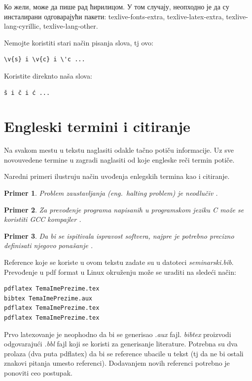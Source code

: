 \documentclass[a4paper]{article}
\newtheorem{primer}{Primer}[section]
\begin{document}
Ко жели, може да пише рад ћирилицом. У том случају, неопходно је да су инсталирани одговарајући пакети: texlive-fonts-extra, texlive-latex-extra, texlive-lang-cyrillic, texlive-lang-other. 

Nemojte koristiti stari način pisanja slova, tj ovo:
\begin{verbatim}
\v{s} i \v{c} i \'c ...
\end{verbatim}
Koristite direknto naša slova:	
\begin{verbatim}
š i č i ć ... 
\end{verbatim}


\section{Engleski termini i citiranje}	
\label{sec:termini_i_citiranje}

Na svakom mestu u tekstu naglasiti odakle tačno potiču informacije. Uz sve novouvedene termine u zagradi naglasiti od koje engleske reči termin potiče. 

Naredni primeri ilustruju način uvođenja enlegskih termina kao i citiranje.

\begin{primer}
Problem zaustavljanja (eng.~{\em halting problem}) je neodlučiv \cite{haltingproblem}.
\end{primer}

\begin{primer}
Za prevođenje programa napisanih u programskom jeziku C može se koristiti GCC kompajler \cite{gcc}.
\end{primer}

\begin{primer}
 Da bi se ispitivala ispravost softvera, najpre je potrebno precizno definisati njegovo ponašanje \cite{laski2009software}. 
\end{primer}

Reference koje se koriste u ovom tekstu zadate su u datoteci {\em seminarski.bib}. Prevođenje u pdf format u Linux okruženju može se uraditi na sledeći način:
\begin{verbatim}
pdflatex TemaImePrezime.tex 
bibtex TemaImePrezime.aux 
pdflatex TemaImePrezime.tex 
pdflatex TemaImePrezime.tex 
\end{verbatim}
Prvo latexovanje je neophodno da bi se generisao {\em .aux} fajl. {\em bibtex} proizvodi odgovarajući {\em .bbl} fajl koji se koristi za generisanje literature. 
Potrebna su dva prolaza (dva puta pdflatex) da bi se reference ubacile u tekst (tj da ne bi ostali znakovi pitanja umesto referenci). Dodavanjem novih referenci potrebno je ponoviti ceo postupak.  
\end{document}

